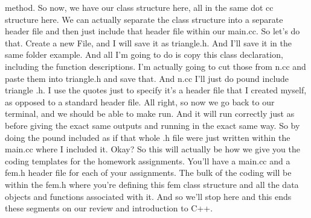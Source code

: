 \documentclass[10pt]{article}
\begin{document}
method. So now, we have our class structure here, all in the same dot cc structure here. We can actually separate the class structure into a separate header file and then just include that header file within our main.cc. So let's do that. Create a new File, and I will save it as triangle.h. And I'll save it in the same folder example. And all I'm going to do is copy this class declaration, including the function descriptions. I'm actually going to cut those from n.cc and paste them into triangle.h and save that. And n.cc I'll just do pound include triangle .h. I use the quotes just to specify it's a header file that I created myself, as opposed to a standard header file. All right, so now we go back to our terminal, and we should be able to make run. And it will run correctly just as before giving the exact same outputs and running in the exact same way. So by doing the pound included as if that whole .h file were just written within the main.cc where I included it. Okay? So this will actually be how we give you the coding templates for the homework assignments. You'll have a main.cc and a fem.h header file for each of your assignments. The bulk of the coding will be within the fem.h where you're defining this fem class structure and all the data objects and functions associated with it. And so we'll stop here and this ends these segments on our review and introduction to C++.
\end{document}
